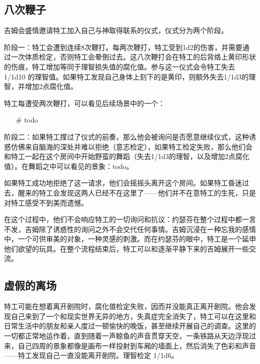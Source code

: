 \subsection{八次鞭子}

吉姆会盛情邀请特工加入自己与神取得联系的仪式，仪式分为两个阶段。

阶段一：特工会遭到连续8次鞭打。每两次鞭打，特工受到1d2的伤害，并需要通过一次体质检定，否则特工会晕倒过去。这八次鞭打会在特工的后背烙上黄印形状的伤痕，特工增加等同于理智损失值的腐化值。参与这一仪式会令特工失去 1/1d10 的理智值。如果特工发现自己身体上刻下的是黄印，则额外失去1/1d3的理智，并增加2点腐化值。

特工每遭受两次鞭打，可以看见后续场景中的一个：

\begin{itemize}
    \item[\#] todo
\end{itemize}

阶段二：如果特工撑过了仪式的前奏，那么他会被询问是否愿意继续仪式，这种诱惑仿佛来自脑海的深处并难以拒绝（意志检定），如果特工检定失败，那么他们会和特工一起在这个房间中开始野蛮的舞蹈（失去1/1d3的理智，以及增加2点腐化值）。在舞蹈之中可以看见的景象：todo。

如果特工成功地拒绝了这一请求，他们会摇摇头离开这个房间。如果特工昏迷过去，醒来的特工会发现这两人已经不在这里了——他们并不在意特工的生死，只是对特工感受不到美而遗憾。

在这个过程中，他们不会响应特工的一切询问和抗议：约瑟芬在整个过程中都一言不发，吉姆除了诱惑性的询问之外不会交代任何事情。吉姆沉浸在一种忘我的感情中，一个可供审美的对象，一种灵感的刺激。而在约瑟芬的眼中，特工是一个延申他们欲望的玩具。在整个流程结束后，特工可以和逐渐平静下来的吉姆展开一些交流。

\subsection{虚假的离场}

特工可能在想着离开剧院时，腐化值检定失败，因而并没能真正离开剧院。他会发现自己来到了一个和现实世界无异的地方，失真症完全消失了，特工可以在这里和日常生活中的朋友和亲人度过一顿愉快的晚饭，甚至继续开展自己的调查。这里的一切都正常地运作着，直到随着一声鲸鱼的声音贯穿天空，一条铁路从天边浮现过来，自己四周的景象都像是画布一样投射到车厢的墙面上，然后消失了色彩和声音——特工发现自己一直没能离开剧院。理智检定 1/1d6。